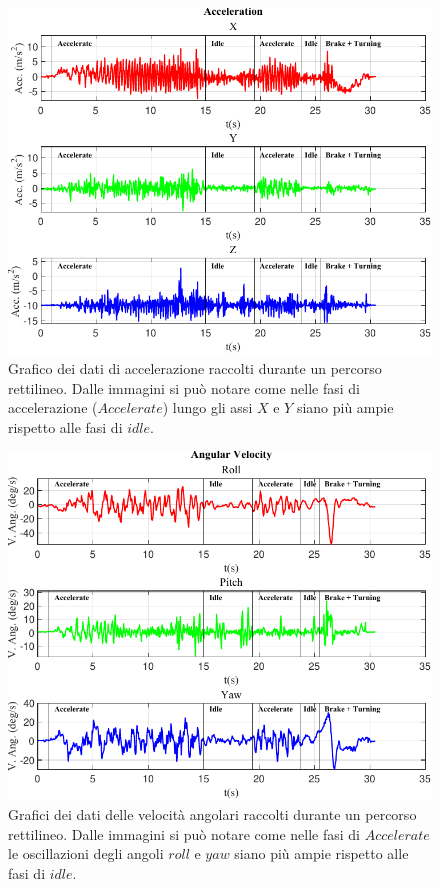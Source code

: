 \documentclass[class=article]{standalone}
\begin{document}
	\begin{center}
		\begin{figure}[h]
			\centering\includegraphics[width=.9\textwidth]{img/Acc LungaF.pdf}
			\caption[]{Grafico dei dati di accelerazione raccolti durante un percorso rettilineo. Dalle immagini si può notare come nelle fasi di accelerazione (\(Accelerate\))  lungo gli assi \(X\) e \(Y\) siano più ampie rispetto alle fasi di \(idle\).}
			\label{fig:AccLunga}
		\end{figure}
		\begin{figure}[h]
			\centering\includegraphics[width=.9\textwidth]{img/Vang LungaF.pdf}
			\caption[]{Grafici dei dati delle velocità angolari raccolti durante un percorso rettilineo. Dalle immagini si può notare come nelle fasi di \(Accelerate\) le oscillazioni degli angoli \(roll\) e \(yaw\) siano più ampie rispetto alle fasi di \(idle\).}
			\label{fig:VAngLunga}
		\end{figure}
	\end{center}
	
\end{document}
